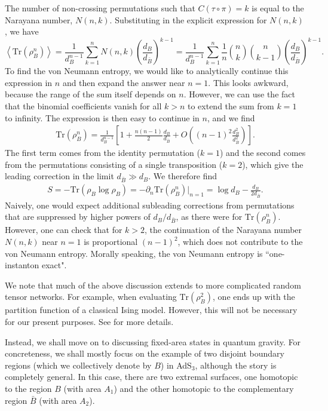 \documentclass[11pt]{article}
\newcommand{\be}{\begin{equation}}
\newcommand{\ee}{\end{equation}}
\numberwithin{equation}{section}
\def\tr{\text{Tr}}
\begin{document}
The number of non-crossing permutations such that $C(\tau\circ\pi) = k$ is equal to the Narayana number, $N(n,k)$. Substituting in the explicit expression for $N(n,k)$, we have
\be
\left\langle \tr (\rho_B^n)\right \rangle = \frac{1}{d_B^{n-1}}\sum_{k = 1}^n N(n,k) \left(\frac{d_B}{d_{\bar B}}\right)^{k-1} = \frac{1}{d_B^{n-1}}\sum_{k = 1}^n \frac{1}{n}\binom{n}{k}\binom{n}{k-1} \left(\frac{d_B}{d_{\bar B}}\right)^{k-1}.
\ee
To find the von Neumann entropy, we would like to analytically continue this expression in $n$ and then expand the answer near $n = 1$. This looks awkward, because the range of the sum itself depends on $n$. However, we can use the fact that the binomial coefficients vanish for all $k>n$ to extend the sum from $k = 1$ to infinity. The expression is then easy to continue in $n$, and we find
\begin{align}
\tr(\rho_B^n) = \frac{1}{d_B^{n-1}} \left[ 1 + \frac{n(n-1)}{2}\frac{d_B}{d_{\bar B}} + O\left((n-1)^2 \frac{d_B^2}{d_{\bar B}^2}\right)\right].
\end{align}
The first term comes from the identity permutation ($k = 1$) and the second comes from the permutations consisting of a single transposition ($k = 2$), which give the leading correction in the limit $d_{\bar B} \gg d_B$. We therefore find
\begin{align}
S = - \tr(\rho_B \log \rho_B) = - \partial_n \tr(\rho_B^n)|_{n=1} = \log d_B - \frac{d_B}{2 d_{\bar B}}.
\end{align} 
Naively, one would expect additional subleading corrections from permutations that are suppressed by higher powers of $d_B/d_{\bar B}$, as there were for $\tr(\rho_B^n)$. However, one can check that for $k>2$, the continuation of the Narayana number $N(n,k)$ near $n =1$ is proportional $(n-1)^2$, which does not contribute to the von Neumann entropy. Morally speaking, the von Neumann entropy is ``one-instanton exact".

We note that much of the above discussion extends to more complicated random tensor networks. For example, when evaluating $\tr(\rho_B^2)$, one ends up with the partition function of a classical Ising model. However, this will not be necessary for our present purposes. See \cite{Hayden:2016cfa} for more details.

Instead, we shall move on to discussing fixed-area states in quantum gravity. For concreteness, we shall mostly focus on the example of two disjoint boundary regions  (which we collectively denote by $B$) in AdS$_3$, although the story is completely general. In this case, there are two extremal surfaces, one homotopic to the region $B$ (with area $A_1$) and the other homotopic to the complementary region $\bar B$ (with area $A_2$). 
\end{document}
